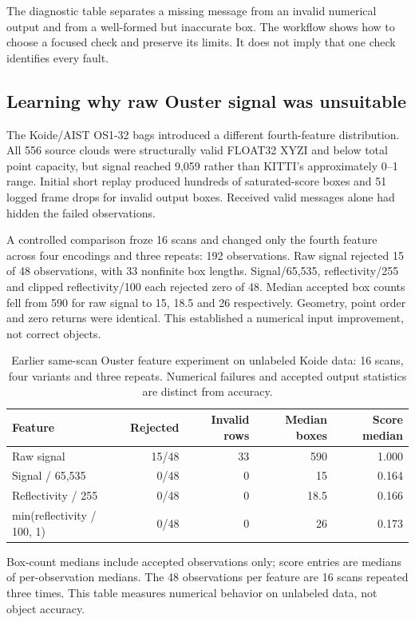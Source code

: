 \documentclass[11pt,a4paper]{article}
\begin{document}
The diagnostic table separates a missing message from an invalid numerical output and from a well-formed but inaccurate box. The workflow shows how to choose a focused check and preserve its limits. It does not imply that one check identifies every fault.

\subsection{Learning why raw Ouster signal was unsuitable}

The Koide/AIST OS1-32 bags introduced a different fourth-feature distribution. All 556 source clouds were structurally valid FLOAT32 XYZI and below total point capacity, but signal reached 9,059 rather than KITTI's approximately 0–1 range. Initial short replay produced hundreds of saturated-score boxes and 51 logged frame drops for invalid output boxes. Received valid messages alone had hidden the failed observations.

A controlled comparison froze 16 scans and changed only the fourth feature across four encodings and three repeats: 192 observations. Raw signal rejected 15 of 48 observations, with 33 nonfinite box lengths. Signal/65,535, reflectivity/255 and clipped reflectivity/100 each rejected zero of 48. Median accepted box counts fell from 590 for raw signal to 15, 18.5 and 26 respectively. Geometry, point order and zero returns were identical. This established a numerical input improvement, not correct objects.

\begin{table}[htbp]\centering\small
\begin{tabularx}{\linewidth}{@{}Yrrrr@{}}
\toprule
Feature & Rejected & Invalid rows & Median boxes & Score median \\
\midrule
Raw signal & 15/48 & 33 & 590 & 1.000 \\
Signal / 65,535 & 0/48 & 0 & 15 & 0.164 \\
Reflectivity / 255 & 0/48 & 0 & 18.5 & 0.166 \\
min(reflectivity / 100, 1) & 0/48 & 0 & 26 & 0.173 \\
\bottomrule
\end{tabularx}
\caption{Earlier same-scan Ouster feature experiment on unlabeled Koide data: 16 scans, four variants and three repeats. Numerical failures and accepted output statistics are distinct from accuracy.}
\end{table}

Box-count medians include accepted observations only; score entries are medians of per-observation medians. The 48 observations per feature are 16 scans repeated three times. This table measures numerical behavior on unlabeled data, not object accuracy.
\end{document}
